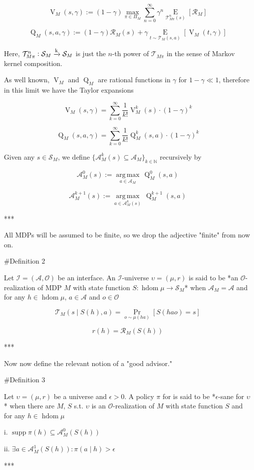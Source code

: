 \documentclass[a4paper]{article}
\DeclareMathOperator{\Supp}{supp}
\newcommand{\E}[1]{\underset{#1}{\operatorname{E}}}
\newcommand{\Argmax}[1]{\underset{#1}{\operatorname{arg\,max}}\,}
\newcommand{\Nats}{\mathbb{N}}
\newcommand{\Sq}[2]{\{#1\}_{#2 \in \Nats}}
\newcommand{\M}{\xrightarrow{\textnormal{k}}}
\newcommand{\Ob}{\mathcal{O}}
\newcommand{\A}{\mathcal{A}}
\newcommand{\St}{\mathcal{S}}
\newcommand{\T}{\mathcal{T}}
\newcommand{\R}{\mathcal{R}}
\newcommand{\In}{\mathcal{I}}
\DeclareMathOperator{\HD}{hdom}
\newcommand{\V}{\operatorname{V}}
\newcommand{\Q}{\operatorname{Q}}
\begin{document}
$$\V_M(s,\gamma):=(1-\gamma)\max_{\pi \in \Pi_M} \sum_{n=0}^\infty \gamma^n \E{\T_{M\pi}^n(s)}\left[\R_M\right]$$

$$\Q_M(s,a,\gamma):=(1-\gamma)\R_M(s)+\gamma\E{t \sim \T_M(s,a)}\left[\V_M(t,\gamma)\right]$$

Here, $\T_{M\pi}^n: \St_M \M \St_M$ is just the $n$-th power of $\T_{M\pi}$ in the sense of Markov kernel composition.

As well known, $\V_M$ and $\Q_M$ are rational functions in $\gamma$ for $1-\gamma \ll 1$, therefore in this limit we have the Taylor expansions

$$\V_M(s,\gamma)=\sum_{k=0}^\infty {\frac{1}{k!} \V_M^k(s)\cdot(1-\gamma)^k}$$

$$\Q_M(s,a,\gamma)=\sum_{k=0}^\infty {\frac{1}{k!} \Q_M^k(s,a)\cdot(1-\gamma)^k}$$

Given any $s \in \St_M$, we define $\Sq{\A_M^k(s) \subseteq \A_M}{k}$ recursively by

$$\A^0_M(s) := \Argmax{a \in \A_M} \Q_M^0(s,a)$$

$$\A^{k+1}_M(s) := \Argmax{a \in \A_M^k(s)} \Q_M^{k+1}(s,a)$$

***

All MDPs will be assumed to be finite, so we drop the adjective "finite" from now on.

\#Definition 2

Let $\In=(\A,\Ob)$ be an interface. An $\In$-universe $\upsilon=(\mu,r)$ is said to be *an $\Ob$-realization of MDP $M$ with state function $S: \HD{\mu} \rightarrow \St_M$* when $\A_M=\A$ and for any $h \in \HD{\mu}$, $a \in \A$ and $o \in \Ob$

$$\T_M\left(s \mid S(h),a\right) =\Pr_{o \sim \mu(ha)}\left[S(hao)=s\right]$$

$$r(h)=\R_M\left(S(h)\right)$$

***

Now now define the relevant notion of a "good advisor."

\#Definition 3

Let $\upsilon = (\mu,r)$ be a universe and $\epsilon > 0$. A policy $\pi$ for is said to be *$\epsilon$-sane for $\upsilon$* when there are $M$, $S$ s.t. $\upsilon$ is an $\Ob$-realization of $M$ with state function $S$ and for any $h \in \HD{\mu}$

i. $\Supp{\pi(h)} \subseteq \A_M^0\left(S(h)\right)$

ii. $\exists a \in \A_M^1\left(S(h)\right): \pi(a \mid h) > \epsilon$

***
\end{document}
